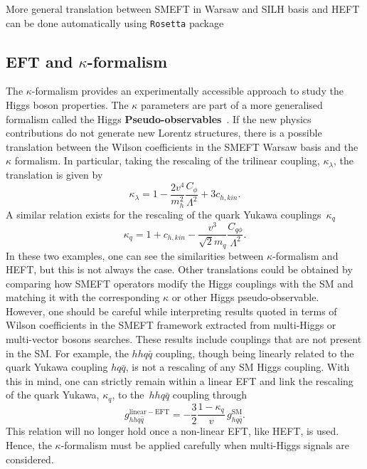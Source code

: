 More general translation between SMEFT in Warsaw and SILH basis and HEFT can be done automatically using \texttt{Rosetta} package~\cite{Falkowski:2015wza}
\subsection{EFT and $\kappa$-formalism \label{eftkappa}}
The $\kappa$-formalism provides an experimentally accessible approach to study the Higgs boson properties. The $\kappa$ parameters are part of a more generalised formalism called the Higgs \textbf{Pseudo-observables}~\cite{Gonzalez-Alonso:2014eva}. 
If the new physics contributions do not generate new Lorentz structures, there is a possible translation between the Wilson coefficients in the SMEFT Warsaw basis and the $\kappa$ formalism. In particular, taking the rescaling of the trilinear coupling, $\kappa_\lambda$, the translation is given by
\begin{equation}
	\kappa_\lambda = 1-\frac{2v^4}{m_h^2} \frac{C_\phi}{\Lambda^2}+3 c_{h,kin}.
\end{equation}
A similar relation exists for the rescaling of the quark Yukawa couplings~$\kappa_q$
\begin{equation}
	\kappa_q = 1+c_{h,kin}- \frac{v^3}{\sqrt{2}m_q}\frac{C_{q\phi}}{\Lambda^2}.
\end{equation}
In these two examples, one can see the similarities between $\kappa$-formalism and HEFT, but this is not always the case.  Other translations could be obtained by comparing how SMEFT operators modify the Higgs couplings with the SM and matching it with the corresponding $\kappa$ or other Higgs pseudo-observable.\\ 
However, one should be careful while interpreting results quoted in terms of Wilson coefficients in the SMEFT framework extracted from multi-Higgs or multi-vector bosons searches. These results include couplings that are not present in the SM. For example, the $hh q\bar{q}$ coupling, though being linearly related to the quark Yukawa coupling $h q\bar{q}$, is not a rescaling of any SM Higgs coupling. With this in mind, one can strictly remain within a linear EFT and link the rescaling of the quark Yukawa, $\kappa_q$, to the~$hh q\bar{q}$ coupling through
\begin{equation}
	g_{hhq\bar{q}}^{\mathrm{linear-EFT}} = -\frac{3}{2}\frac{1-\kappa_q}{v} \, g_{h q\bar{q}}^{\mathrm{SM}}.
\end{equation}
This relation will no longer hold once a non-linear EFT, like HEFT, is used. Hence, the $\kappa$-formalism must be applied carefully when multi-Higgs signals are considered.
